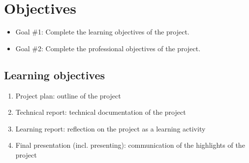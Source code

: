 \documentclass{report}
\begin{document}
	
	
	\section{Objectives}
	
	
	\begin{itemize}
		\item Goal \#1: Complete the learning objectives of the project.
		\item Goal \#2: Complete the professional objectives of the project.
	\end{itemize}
	
	\subsection{Learning objectives}
	\begin{enumerate}
		\item Project plan: outline of the project
		\item Technical report: technical documentation of the project
		\item Learning report: reflection on the project as a learning activity
		\item Final presentation (incl. presenting): communication of the highlights of the project 
	\end{enumerate}
	
\end{document}
